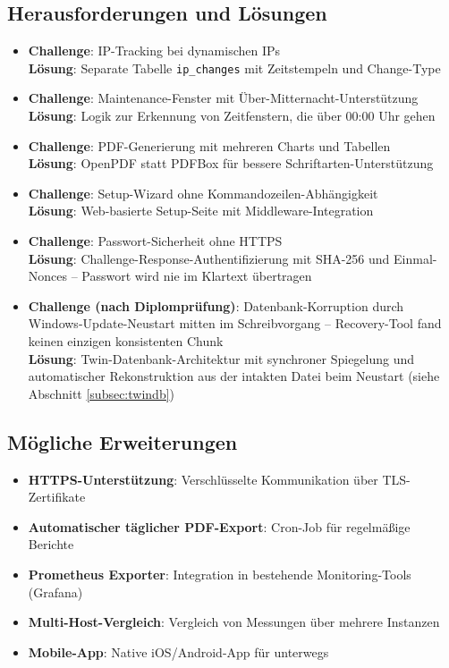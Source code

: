 \subsection{Herausforderungen und Lösungen}
\begin{itemize}
    \item \textbf{Challenge}: IP-Tracking bei dynamischen IPs \\
    \textbf{Lösung}: Separate Tabelle \texttt{ip\_changes} mit Zeitstempeln und Change-Type

    \item \textbf{Challenge}: Maintenance-Fenster mit Über-Mitternacht-Unterstützung \\
    \textbf{Lösung}: Logik zur Erkennung von Zeitfenstern, die über 00:00 Uhr gehen

    \item \textbf{Challenge}: PDF-Generierung mit mehreren Charts und Tabellen \\
    \textbf{Lösung}: OpenPDF statt PDFBox für bessere Schriftarten-Unterstützung

    \item \textbf{Challenge}: Setup-Wizard ohne Kommandozeilen-Abhängigkeit \\
    \textbf{Lösung}: Web-basierte Setup-Seite mit Middleware-Integration

    \item \textbf{Challenge}: Passwort-Sicherheit ohne HTTPS \\
    \textbf{Lösung}: Challenge-Response-Authentifizierung mit SHA-256 und Einmal-Nonces -- Passwort wird nie im Klartext übertragen

    \item \textbf{Challenge (nach Diplomprüfung)}: Datenbank-Korruption durch Windows-Update-Neustart mitten im Schreibvorgang -- Recovery-Tool fand keinen einzigen konsistenten Chunk \\
    \textbf{Lösung}: Twin-Datenbank-Architektur mit synchroner Spiegelung und automatischer Rekonstruktion aus der intakten Datei beim Neustart (siehe Abschnitt \ref{subsec:twindb})
\end{itemize}

\subsection{Mögliche Erweiterungen}
\begin{itemize}
    \item \textbf{HTTPS-Unterstützung}: Verschlüsselte Kommunikation über TLS-Zertifikate
    \item \textbf{Automatischer täglicher PDF-Export}: Cron-Job für regelmäßige Berichte
    \item \textbf{Prometheus Exporter}: Integration in bestehende Monitoring-Tools (Grafana)
    \item \textbf{Multi-Host-Vergleich}: Vergleich von Messungen über mehrere Instanzen
    \item \textbf{Mobile-App}: Native iOS/Android-App für unterwegs
\end{itemize}

